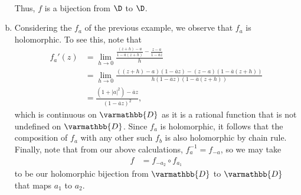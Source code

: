 \documentclass[10pt]{mypackage}
\renewcommand*{\mathbb}[1]{\varmathbb{#1}}
\begin{document}
\begin{solution}
\begin{enumerate}[(a)]
\begin{align*}
      \end{align*}
      Thus, $f$ is a bijection from $\D$ to $\D$.
    \item Considering the $f_a$ of the previous example, we observe that $f_a$ is holomorphic. To see this, note that
      \begin{align*}
        f_a'(z) &= \lim_{h\rightarrow 0} \frac{\frac{\left( z+h \right) - a}{1 - \overline{a}\left( z+h \right)} - \frac{z-a}{1- \overline{a}z}}{h}\\
                &= \lim_{h\rightarrow 0} \frac{\left( \left( z+h \right) - a \right)\left( 1- \overline{a}z \right) - \left( z-a \right)\left( 1 - \overline{a}\left( z+h \right) \right)}{h\left( 1- \overline{a}z \right)\left( 1- \overline{a}\left( z+h \right) \right)}\\
                &= \frac{\left( 1 + \left\vert a \right\vert^2 \right) - \overline{a}z}{\left( 1- \overline{a}z \right)^2},
      \end{align*}
      which is continuous on $ \mathbb{D} $ as it is a rational function that is not undefined on $ \mathbb{D} $. Since $f_a$ is holomorphic, it follows that the composition of $f_a$ with any other such $f_b$ is also holomorphic by chain rule. Finally, note that from our above calculations, $f_{a}^{-1} = f_{-a}$, so we may take
      \begin{align*}
        f &= f_{-a_2}\circ f_{a_1}
      \end{align*}
      to be our holomorphic bijection from $ \mathbb{D} $ to $ \mathbb{D} $ that maps $a_1$ to $a_2$.
  \end{enumerate}
\end{solution}
\end{document}
